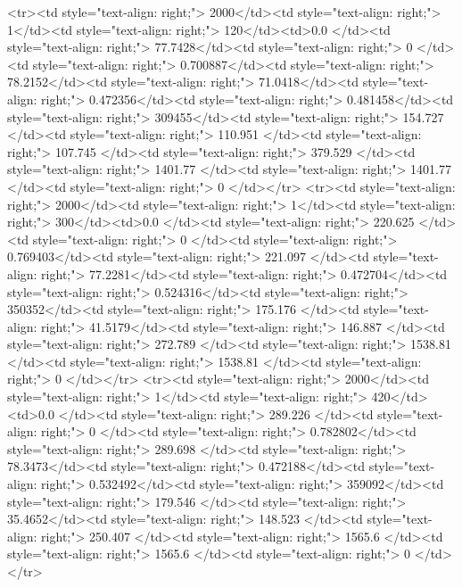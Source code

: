 <tr><td style="text-align: right;">      2000</td><td style="text-align: right;">         1</td><td style="text-align: right;">           120</td><td>0.0          </td><td style="text-align: right;">                77.7428</td><td style="text-align: right;">             0     </td><td style="text-align: right;">         0.700887</td><td style="text-align: right;">         78.2152</td><td style="text-align: right;">            71.0418</td><td style="text-align: right;">               0.472356</td><td style="text-align: right;">             0.481458</td><td style="text-align: right;">              309455</td><td style="text-align: right;">                      154.727 </td><td style="text-align: right;">           110.951 </td><td style="text-align: right;">               107.745  </td><td style="text-align: right;">       379.529 </td><td style="text-align: right;">   1401.77 </td><td style="text-align: right;">      1401.77 </td><td style="text-align: right;">                  0     </td></tr>
<tr><td style="text-align: right;">      2000</td><td style="text-align: right;">         1</td><td style="text-align: right;">           300</td><td>0.0          </td><td style="text-align: right;">               220.625 </td><td style="text-align: right;">             0     </td><td style="text-align: right;">         0.769403</td><td style="text-align: right;">        221.097 </td><td style="text-align: right;">            77.2281</td><td style="text-align: right;">               0.472704</td><td style="text-align: right;">             0.524316</td><td style="text-align: right;">              350352</td><td style="text-align: right;">                      175.176 </td><td style="text-align: right;">            41.5179</td><td style="text-align: right;">               146.887  </td><td style="text-align: right;">       272.789 </td><td style="text-align: right;">   1538.81 </td><td style="text-align: right;">      1538.81 </td><td style="text-align: right;">                  0     </td></tr>
<tr><td style="text-align: right;">      2000</td><td style="text-align: right;">         1</td><td style="text-align: right;">           420</td><td>0.0          </td><td style="text-align: right;">               289.226 </td><td style="text-align: right;">             0     </td><td style="text-align: right;">         0.782802</td><td style="text-align: right;">        289.698 </td><td style="text-align: right;">            78.3473</td><td style="text-align: right;">               0.472188</td><td style="text-align: right;">             0.532492</td><td style="text-align: right;">              359092</td><td style="text-align: right;">                      179.546 </td><td style="text-align: right;">            35.4652</td><td style="text-align: right;">               148.523  </td><td style="text-align: right;">       250.407 </td><td style="text-align: right;">   1565.6  </td><td style="text-align: right;">      1565.6  </td><td style="text-align: right;">                  0     </td></tr>
